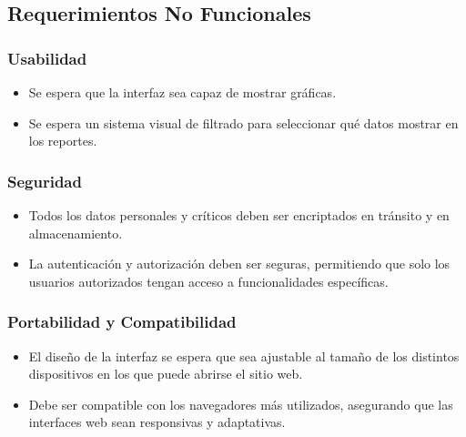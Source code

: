 \documentclass{report}
\begin{document}
        \vspace{1cm}

        \subsection*{Requerimientos No Funcionales}

            \vspace{0.3cm}

            \subsubsection*{Usabilidad}
            \begin{itemize}
                \item Se espera que la interfaz sea capaz de mostrar gráficas.
                \item Se espera un sistema visual de filtrado para seleccionar qué datos mostrar en los reportes.
            \end{itemize}
        
            \subsubsection*{Seguridad}
            \begin{itemize}
                \item Todos los datos personales y críticos deben ser encriptados en tránsito y en almacenamiento.
                \item La autenticación y autorización deben ser seguras, permitiendo que solo los usuarios 
                autorizados tengan acceso a funcionalidades específicas.
            \end{itemize}
        
            \subsubsection*{Portabilidad y Compatibilidad}
            \begin{itemize}
                \item El diseño de la interfaz se espera que sea ajustable al tamaño de los distintos dispositivos 
                en los que puede abrirse el sitio web.
                \item Debe ser compatible con los navegadores más utilizados, asegurando que las interfaces web 
                sean responsivas y adaptativas.
            \end{itemize}
        
\end{document}
